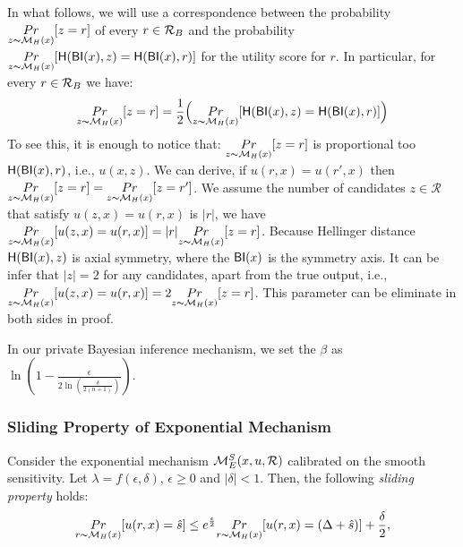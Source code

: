 In what follows, we will use a correspondence between the probability
 $\underset{z \thicksim \mathcal{M}_H(x)}{Pr}[z = r]$ of every
 $r\in\mathcal{R}_{B}$ and the probability 
 $\underset{z \thicksim \mathcal{M}_H(x)}{Pr}[\mathsf{H}(\mathsf{BI}(x),z) =
 \mathsf{H}(\mathsf{BI}(x),r)]$ for the utility score for $r$. In particular, for every
 $r\in\mathcal{R}_{B}$ we have:
$$
\underset{z \thicksim \mathcal{M}_H(x)}{Pr}[z = r]=
\frac{1}{2}\Big (\underset{z \thicksim \mathcal{M}_H(x)}{Pr}[\mathsf{H}(\mathsf{BI}(x),z) =
 \mathsf{H}(\mathsf{BI}(x),r)]\Big )
$$
To see this, it is enough to notice that: $\underset{z \thicksim \mathcal{M}_H(x)}{Pr}[z = r]$ is proportional too $\mathsf{H}(\mathsf{BI}(x),r)$, i.e., $u(x,z)$. We can derive, if $u(r,x) = u(r',x)$ then $\underset{z \thicksim \mathcal{M}_H(x)}{Pr}[z = r] = \underset{z \thicksim \mathcal{M}_H(x)}{Pr}[z = r']$. We assume the number of candidates $z \in \mathcal{R}$ that satisfy $u(z,x) = u(r,x)$ is $|r|$, we have  $\underset{z \thicksim \mathcal{M}_H(x)}{Pr}[u(z,x) = u(r,x)] = |r| \underset{z \thicksim \mathcal{M}_H(x)}{Pr}[z = r]$. Because Hellinger distance  $\mathsf{H}(\mathsf{BI}(x),z)$ is axial symmetry, where the $\mathsf{BI}(x)$ is the symmetry axis. It can be infer that $|z| = 2$ for any candidates, apart from the true output, i.e., $\underset{z \thicksim \mathcal{M}_H(x)}{Pr}[u(z,x) = u(r,x)] = 2 \underset{z \thicksim \mathcal{M}_H(x)}{Pr}[z = r]$. This parameter can be eliminate in both sides in proof.

In our private Bayesian inference mechanism, we set the $\beta$ as $\ln(1 - \frac{\epsilon}{2 \ln (\frac{\delta}{2 (n + 1)})})$. 


\subsubsection{Sliding Property of Exponential Mechanism}
\begin{lem}
Consider the exponential mechanism  $\mathcal{M}_E^S(x,u,\mathcal{R})$
calibrated on the smooth sensitivity. Let $\lambda = f(\epsilon,
\delta)$, $\epsilon\geq 0$ and $|\delta| < 1$. Then, the following \emph{sliding property} holds:
\begin{equation*}
\underset{r \thicksim \mathcal{M}_H(x)}{Pr}[u(r,x) = \hat{s}]
\leq
e^{\frac{\epsilon}{2}} \underset{r \thicksim \mathcal{M}_H(x)}{Pr}[u(r,x) = (\Delta + \hat{s})] + \frac{\delta}{2},
\end{equation*}

\end{lem}

